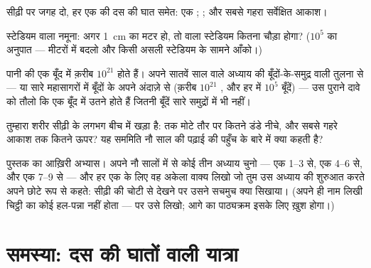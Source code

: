 \begin{exercise}[$\star$]\label{exo:g9:atoms-to-galaxies:8}
सीढ़ी पर जगह दो, हर एक की दस की घात समेत: एक ; ;
और सबसे गहरा सर्वेक्षित आकाश।
\end{exercise}

\begin{exercise}[$\star\star$]\label{exo:g9:atoms-to-galaxies:9}
स्टेडियम वाला नमूना: अगर  \qty{1}{cm} का मटर हो, तो  वाला
स्टेडियम कितना चौड़ा होगा? ($10^{5}$ का अनुपात --- मीटरों में बदलो और
किसी असली स्टेडियम के सामने आँको।)
\end{exercise}

\begin{exercise}[$\star\star$]\label{exo:g9:atoms-to-galaxies:10}
पानी की एक बूँद में क़रीब $10^{21}$  होते हैं। अपने सातवें साल वाले
अध्याय की बूँदों-के-समुद्र वाली तुलना से --- या सारे महासागरों में
बूँदों के अपने अंदाज़े से (क़रीब $10^{21}$ , और हर  में $10^{5}$
बूँदें) --- उस पुराने दावे को तौलो कि एक बूँद में उतने  होते हैं
जितनी बूँदें सारे समुद्रों में भी नहीं।
\end{exercise}

\begin{exercise}[$\star\star$]\label{exo:g9:atoms-to-galaxies:11}
तुम्हारा शरीर सीढ़ी के लगभग बीच में खड़ा है:  तक मोटे तौर पर
कितने डंडे नीचे, और सबसे गहरे आकाश तक कितने ऊपर? यह सममिति नौ साल की
पढ़ाई की पहुँच के बारे में क्या कहती है?
\end{exercise}

\begin{exercise}[$\star\star\star$]\label{exo:g9:atoms-to-galaxies:12}
पुस्तक का आख़िरी अभ्यास। अपने नौ सालों में से कोई तीन अध्याय चुनो ---
एक  1--3 से, एक 4--6 से, और एक 7--9 से --- और हर एक के लिए वह
अकेला वाक्य लिखो जो तुम उस अध्याय की शुरुआत करते अपने छोटे रूप से
कहते: सीढ़ी की चोटी से देखने पर उसने सचमुच क्या सिखाया। (अपने ही नाम
लिखी चिट्ठी का कोई हल-पन्ना नहीं होता --- पर उसे लिखो; आगे का
पाठ्यक्रम इसके लिए ख़ुश होगा।)
\end{exercise}

\section{समस्या: दस की घातों वाली यात्रा}

